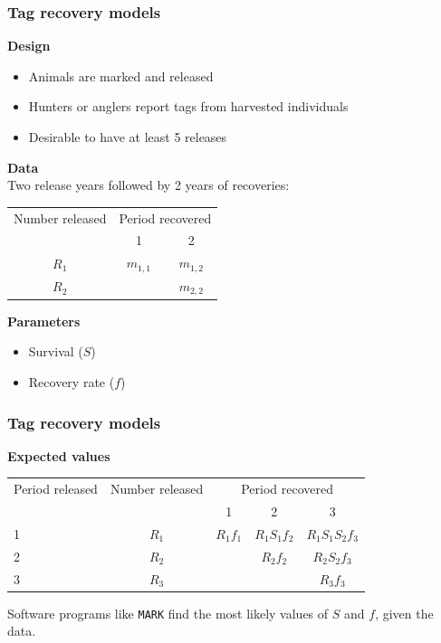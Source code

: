 \documentclass[color=usenames,dvipsnames]{beamer}\usepackage[]{graphicx}\usepackage[]{color}
\begin{document}
\begin{frame}
  \frametitle{Tag recovery models}
  {\bf Design}
  \begin{itemize}
    \item Animals are marked and released
    \item Hunters or anglers report tags from harvested individuals
    \item Desirable to have at least 5 releases
  \end{itemize}
  \pause
  \vfill
  {\bf Data}                                                 \\
  Two release years followed by 2 years of recoveries:
  \begin{center}
    \begin{tabular}{ccc}
      \hline
      Number released & \multicolumn{2}{c}{Period recovered} \\
      \cline{2-3}
                      & 1         & 2                        \\
      \hline
      $R_1$           & $m_{1,1}$ & $m_{1,2}$                \\
      $R_2$           &           & $m_{2,2}$                \\
      \hline
    \end{tabular}
  \end{center}
  \pause
  \vfill
  {\bf Parameters}                                           \\
  \begin{itemize}
    \item Survival ($S$)
    \item Recovery rate ($f$)
  \end{itemize}
\end{frame}


\begin{frame}
  \frametitle{Tag recovery models}
  {\bf Expected values}
  \begin{center}
    \begin{tabular}{lcccc}
      \hline
      Period released & Number released & \multicolumn{3}{c}{Period recovered} \\
      \cline{3-5}
                    &  & 1 & 2 & 3 \\
      \hline
      1 & $R_1$ & $R_1f_1$ & $R_1S_1f_2$ & $R_1S_1S_2f_3$ \\
      2 & $R_2$ &          & $R_2f_2$ & $R_2S_2f_3$ \\
      3 & $R_3$ &          &          & $R_3f_3$ \\
      \hline
    \end{tabular}
  \end{center}
  \pause
  \vfill
  \centering
  Software programs like {\tt MARK} find the most likely values of $S$
  and $f$, given the data. \\
\end{frame}
\end{document}
